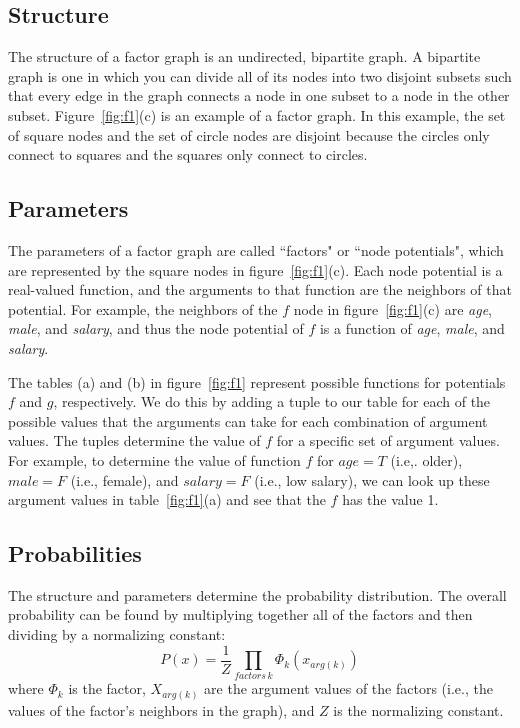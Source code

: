 \documentclass[twoside]{article}
\begin{document}
\subsection{Structure}
The structure of a factor graph is an undirected, bipartite graph.
A bipartite graph is one in which you can divide all of its nodes into two disjoint subsets such that every edge in the graph connects
a node in one subset to a node in the other subset. Figure~\ref{fig:f1}(c) is an example of a factor graph.
In this example, the set of square nodes and the set of circle nodes are disjoint because the circles only connect to squares and the squares only connect to circles.

\subsection{Parameters}
The parameters of a factor graph are called ``factors" or ``node potentials", which are represented by the square nodes in figure~\ref{fig:f1}(c). 
Each node potential is a real-valued function, and the arguments to that function are the neighbors of that potential. 
For example, the neighbors of the $f$ node in figure~\ref{fig:f1}(c) are \textit{age}, \textit{male}, and \textit{salary}, 
and thus the node potential of $f$ is a function of  \textit{age}, \textit{male}, and \textit{salary}.

The tables (a) and (b) in figure~\ref{fig:f1} represent possible functions for potentials $f$ and $g$, respectively. 
We do this by adding a tuple to our table for each of the possible values that the arguments can take
for each combination of argument values.
The tuples determine the value of $f$ for a specific set of argument values.
For example, to determine the value of function $f$ for $age=T$ (i.e,. older), $male=F$ (i.e., female), and $salary=F$ (i.e., low salary), we can look up these argument values in table~\ref{fig:f1}(a) and see that the $f$ has the value 1.

\subsection{Probabilities}
The structure and parameters determine the probability distribution. The overall probability can be found by multiplying together all of the factors and then dividing by a normalizing constant:
\begin{equation*}
P(x)=\frac{1}{Z}\prod_{factors\,k}\Phi_k(x_{arg(k)})
\end{equation*}
where $\Phi_k$ is the factor, $X_{arg(k)}$ are the argument values of the factors (i.e., the values of the factor's neighbors in the graph), and $Z$ is the normalizing constant.
\end{document}
